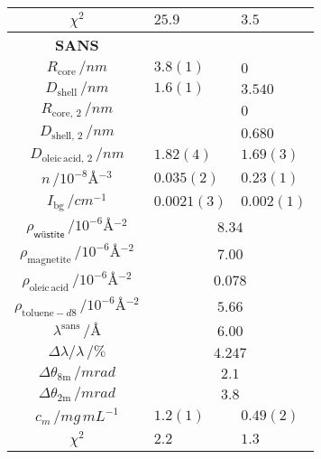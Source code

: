 \documentclass[\main/dresen_thesis.tex]{subfiles}
\begin{document}
\begin{table}[!htbp]
\begin{tabular}{ c | l | l }
        \hline
        \rule{0pt}{2ex} $\chi^2$                                                            & $25.9$               & $3.5$\\
        \hline
        \hline
        \rule{0pt}{2ex} \textbf{SANS} \\
        \hline
        \rule{0pt}{2ex} $R_\mathrm{core} \, / \unit{nm}$                                    & $3.8(1)$             & $0$\\
        \rule{0pt}{2ex} $D_\mathrm{shell}\, / \unit{nm}$                                    & $1.6(1)$             & $3.540$    \\
        \rule{0pt}{2ex} $R_{\mathrm{core},\, 2} \, / \unit{nm}$                             &                      & $0$\\
        \rule{0pt}{2ex} $D_{\mathrm{shell}, \, 2}\, / \unit{nm}$                            &                      & $0.680$    \\
        \rule{0pt}{2ex} $D_{\mathrm{oleic \, acid}, \, 2}\, / \unit{nm}$                    & $1.82(4)$            & $1.69(3)$    \\
        \rule{0pt}{2ex} $n \, / \unit{10^{-8} \angstrom^{-3}}$                              & $0.035(2)$           & $0.23(1)$\\
        \rule{0pt}{2ex} $I_\mathrm{bg} \, / \unit{cm^{-1}}$                                 & $0.0021(3)$          & $0.002(1)$\\
        \hline
        \rule{0pt}{2ex} $\rho_\textsf{w\"ustite} \, / \unit{10^{-6} \angstrom^{-2}}$        & \multicolumn{2}{c}{$8.34$}\\
        \rule{0pt}{2ex} $\rho_\mathrm{magnetite} \, / \unit{10^{-6} \angstrom^{-2}}$        & \multicolumn{2}{c}{$7.00$}\\
        \rule{0pt}{2ex} $\rho_\mathrm{oleic \, acid} \, / \unit{10^{-6} \angstrom^{-2}}$    & \multicolumn{2}{c}{$0.078$}\\
        \rule{0pt}{2ex} $\rho_{\mathrm{toluene-}d8} \, / \unit{10^{-6} \angstrom^{-2}}$     & \multicolumn{2}{c}{$5.66$}\\
        \rule{0pt}{2ex} $\lambda^\mathrm{sans} \, / \unit{\unit{\angstrom}}$                & \multicolumn{2}{c}{$6.00$}\\
        \rule{0pt}{2ex} $\Delta \lambda / \lambda \, / \unit{\%}$                           & \multicolumn{2}{c}{$4.247$}\\
        \rule{0pt}{2ex} $\Delta \theta_\mathrm{8 m} \, / \unit{mrad}$                       & \multicolumn{2}{c}{$2.1$}\\
        \rule{0pt}{2ex} $\Delta \theta_\mathrm{2 m} \, / \unit{mrad}$                       & \multicolumn{2}{c}{$3.8$}\\
        \hline
        \rule{0pt}{2ex} $c_m \, / \unit{mg\, mL^{-1}}$                                      & $1.2(1)$            &  $0.49(2)$\\
        \hline
    \rule{0pt}{2ex} $\chi^2$                                                                & $2.2$         & $1.3$\\
        \hline
      \end{tabular}
    \end{table}
\end{document}
